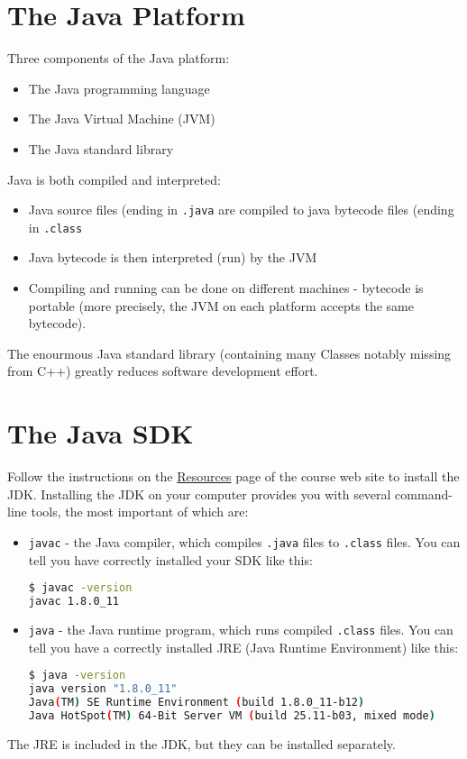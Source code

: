 \documentclass{article}
\begin{document}
\section{The Java Platform}


Three components of the Java platform:
\begin{itemize}
\item The Java programming language
\item The Java Virtual Machine (JVM)
\item The Java standard library
\end{itemize}
Java is both compiled and interpreted:
\begin{itemize}
\item Java source files (ending in {\tt .java} are compiled to java
  bytecode files (ending in {\tt .class}
\item Java bytecode is then interpreted (run) by the JVM
\item Compiling and running can be done on different machines -
  bytecode is portable (more precisely, the JVM on each platform
  accepts the same bytecode).
\end{itemize}
The enourmous Java standard library (containing many Classes notably
missing from C++) greatly reduces software development effort.

\section{The Java SDK}

\vspace{-.05in}
Follow the instructions on the \href{http://cs1331.org/resources.html}{Resources} page of the course web site to install the JDK. Installing the JDK on your computer provides you with several command-line tools, the most important of which are:

\begin{itemize}
\item {\tt javac} - the Java compiler, which compiles {\tt .java} files to {\tt .class} files.  You can tell you have correctly installed your SDK like this:
\begin{lstlisting}[language=bash]
$ javac -version
javac 1.8.0_11
\end{lstlisting}

\item {\tt java} - the Java runtime program, which runs compiled {\tt .class} files.  You can tell you have a correctly installed JRE (Java Runtime Environment) like this:
\begin{lstlisting}[language=bash]
$ java -version
java version "1.8.0_11"
Java(TM) SE Runtime Environment (build 1.8.0_11-b12)
Java HotSpot(TM) 64-Bit Server VM (build 25.11-b03, mixed mode)
\end{lstlisting}

\end{itemize}
\vspace{-.05in}
The JRE is included in the JDK, but they can be installed separately.
\end{document}
